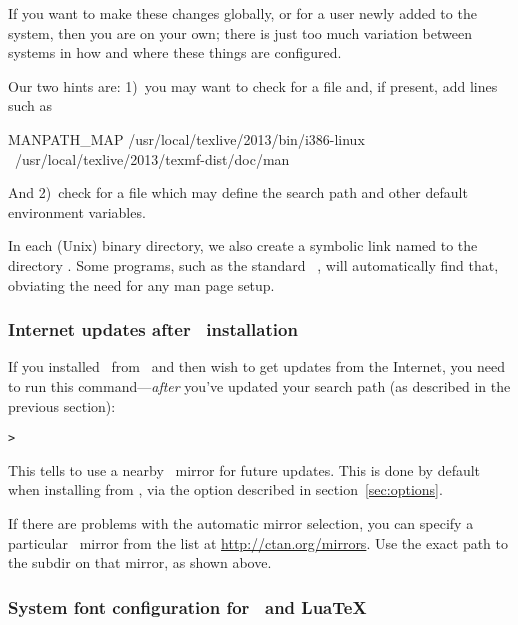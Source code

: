 \documentclass{article}
\begin{document}
If you want to make these changes globally, or for a user newly added to
the system, then you are on your own; there is just too much variation
between systems in how and where these things are configured.

Our two hints are: 1)~you may want to check for a file
 and, if present, add lines such as

\begin{sverbatim}
MANPATH_MAP /usr/local/texlive/2013/bin/i386-linux \
            /usr/local/texlive/2013/texmf-dist/doc/man
\end{sverbatim}

And 2)~check for a file  which may define the
search path and other default environment variables.

In each (Unix) binary directory, we also create a symbolic link named
 to the directory \dirname{texmf/doc/man}.  Some 
programs, such as the standard \MacOSX\ \code{man}, will automatically
find that, obviating the need for any man page setup.


\subsubsection{Internet updates after \DVD\ installation}
\label{sec:dvd-install-net-updates}

If you installed \TL\ from \DVD\ and then wish to get updates from the
Internet, you need to run this command---\emph{after} you've updated
your search path (as described in the previous section):

\begin{alltt}
> 
\end{alltt}

This tells  to use a nearby \CTAN\ mirror for future updates.
This is done by default when installing from \DVD, via the option
described in section~\ref{sec:options}.

If there are problems with the automatic mirror selection, you can
specify a particular \CTAN\ mirror from the list at
\url{http://ctan.org/mirrors}.  Use the exact path to the
 subdir on that mirror, as shown above.


\subsubsection{System font configuration for \XeTeX\ and Lua\TeX}
\label{sec:font-conf-sys}
\end{document}
